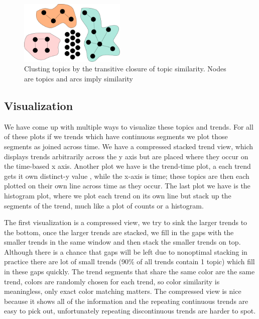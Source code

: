 \documentclass[times, 10pt,twocolumn]{article}
\begin{document}
\begin{figure}
  \centering
  \includegraphics[width=0.45\textwidth]{transitiveclosure}
  \caption{Clusting topics by the transitive closure of topic similarity. Nodes are topics and arcs imply similarity}
\label{fig:closure}
\end{figure}



\subsection{Visualization}

We have come up with multiple ways to visualize these topics and
trends.  For all of these plots if we trends which have continuous
segments we plot those segments as joined across time.  We have a
compressed stacked trend view, which displays trends arbitrarily
across the y axis but are placed where they occur on the time-based x
axis. Another plot we have is the trend-time plot, a each trend gets
it own distinct-y value , while the x-axis is time; these topics are
then each plotted on their own line across time as they occur. The
last plot we have is the histogram plot, where we plot each trend on
its own line but stack up the segments of the trend, much like a plot
of counts or a histogram.


The first visualization is a compressed view, we try to sink the
larger trends to the bottom, once the larger trends are stacked, we
fill in the gaps with the smaller trends in the same window and then
stack the smaller trends on top. Although there is a chance that gaps
will be left due to nonoptimal stacking in practice there are lot of
small trends (90\% of all trends contain 1 topic) which fill in these
gaps quickly. The trend segments that share the same color are the
same trend, colors are randomly chosen for each trend, so color
similarity is meaningless, only exact color matching matters.
The compressed view is nice because it shows all of the
information and the repeating continuous trends are easy to pick out,
unfortunately repeating discontinuous trends are harder to spot.
\end{document}
